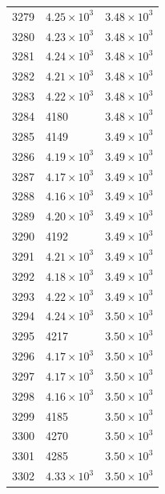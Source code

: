 \begin{table}[H]
\begin{tabular}{lll}
3279 & $\displaystyle 4.25 \times 10^{3}$ & $\displaystyle 3.48 \times 10^{3}$ \\
3280 & $\displaystyle 4.23 \times 10^{3}$ & $\displaystyle 3.48 \times 10^{3}$ \\
3281 & $\displaystyle 4.24 \times 10^{3}$ & $\displaystyle 3.48 \times 10^{3}$ \\
3282 & $\displaystyle 4.21 \times 10^{3}$ & $\displaystyle 3.48 \times 10^{3}$ \\
3283 & $\displaystyle 4.22 \times 10^{3}$ & $\displaystyle 3.48 \times 10^{3}$ \\
3284 & 4180 & $\displaystyle 3.48 \times 10^{3}$ \\
3285 & 4149 & $\displaystyle 3.49 \times 10^{3}$ \\
3286 & $\displaystyle 4.19 \times 10^{3}$ & $\displaystyle 3.49 \times 10^{3}$ \\
3287 & $\displaystyle 4.17 \times 10^{3}$ & $\displaystyle 3.49 \times 10^{3}$ \\
3288 & $\displaystyle 4.16 \times 10^{3}$ & $\displaystyle 3.49 \times 10^{3}$ \\
3289 & $\displaystyle 4.20 \times 10^{3}$ & $\displaystyle 3.49 \times 10^{3}$ \\
3290 & 4192 & $\displaystyle 3.49 \times 10^{3}$ \\
3291 & $\displaystyle 4.21 \times 10^{3}$ & $\displaystyle 3.49 \times 10^{3}$ \\
3292 & $\displaystyle 4.18 \times 10^{3}$ & $\displaystyle 3.49 \times 10^{3}$ \\
3293 & $\displaystyle 4.22 \times 10^{3}$ & $\displaystyle 3.49 \times 10^{3}$ \\
3294 & $\displaystyle 4.24 \times 10^{3}$ & $\displaystyle 3.50 \times 10^{3}$ \\
3295 & 4217 & $\displaystyle 3.50 \times 10^{3}$ \\
3296 & $\displaystyle 4.17 \times 10^{3}$ & $\displaystyle 3.50 \times 10^{3}$ \\
3297 & $\displaystyle 4.17 \times 10^{3}$ & $\displaystyle 3.50 \times 10^{3}$ \\
3298 & $\displaystyle 4.16 \times 10^{3}$ & $\displaystyle 3.50 \times 10^{3}$ \\
3299 & 4185 & $\displaystyle 3.50 \times 10^{3}$ \\
3300 & 4270 & $\displaystyle 3.50 \times 10^{3}$ \\
3301 & 4285 & $\displaystyle 3.50 \times 10^{3}$ \\
3302 & $\displaystyle 4.33 \times 10^{3}$ & $\displaystyle 3.50 \times 10^{3}$ \\

\end{tabular}
\end{table}
